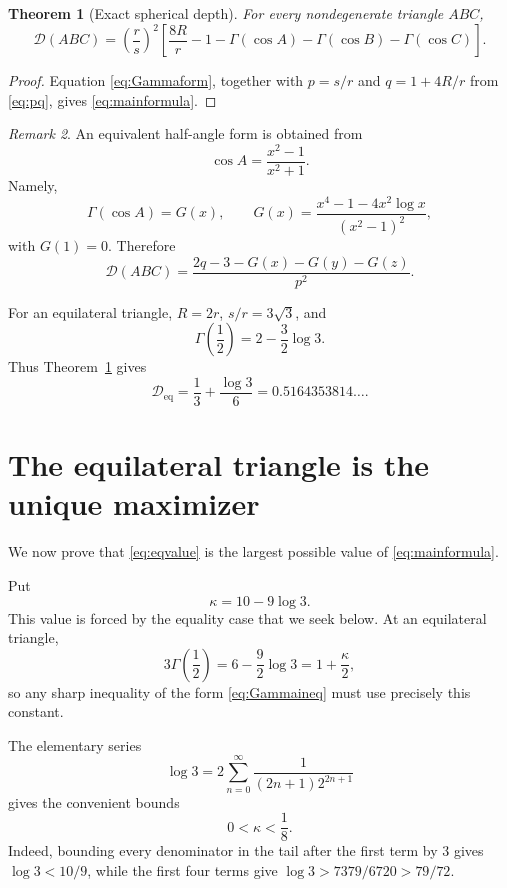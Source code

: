 \documentclass[11pt]{article}
\newtheorem{theorem}{Theorem}[section]
\theoremstyle{definition}
\theoremstyle{remark}
\newtheorem{remark}[theorem]{Remark}
\begin{document}
\begin{theorem}[Exact spherical depth]
\label{thm:formula}
For every nondegenerate triangle $ABC$,
\begin{equation}
\label{eq:mainformula}
\boxed{
\mathcal D(ABC)
=
\left(\frac r s\right)^2
\left[
\frac{8R}{r}-1
-\Gamma(\cos A)-\Gamma(\cos B)-\Gamma(\cos C)
\right].
}
\end{equation}
\end{theorem}

\begin{proof}
Equation \eqref{eq:Gammaform}, together with $p=s/r$ and $q=1+4R/r$ from \eqref{eq:pq}, gives \eqref{eq:mainformula}.
\end{proof}

\begin{remark}
An equivalent half-angle form is obtained from
\[
\cos A=\frac{x^2-1}{x^2+1}.
\]
Namely,
\[
\Gamma(\cos A)
=
G(x),
\qquad
G(x)=\frac{x^4-1-4x^2\log x}{(x^2-1)^2},
\]
with $G(1)=0$.  Therefore
\[
\mathcal D(ABC)
=
\frac{2q-3-G(x)-G(y)-G(z)}{p^2}.
\]
\end{remark}

For an equilateral triangle, $R=2r$, $s/r=3\sqrt3$, and
\[
\Gamma\left(\frac12\right)=2-\frac32\log3.
\]
Thus Theorem~\ref{thm:formula} gives
\begin{equation}
\label{eq:eqvalue}
\mathcal D_{\mathrm{eq}}
=
\frac13+\frac{\log3}{6}
=0.5164353814\ldots.
\end{equation}

\section{The equilateral triangle is the unique maximizer}
\label{sec:max}

We now prove that \eqref{eq:eqvalue} is the largest possible value of \eqref{eq:mainformula}.

Put
\begin{equation}
\label{eq:kappa}
\kappa=10-9\log3.
\end{equation}
This value is forced by the equality case that we seek below.  At an equilateral triangle,
\[
3\Gamma\left(\frac12\right)
=6-\frac92\log3
=1+\frac\kappa2,
\]
so any sharp inequality of the form \eqref{eq:Gammaineq} must use precisely this constant.

The elementary series
\[
\log3
=2\sum_{n=0}^{\infty}\frac{1}{(2n+1)2^{2n+1}}
\]
gives the convenient bounds
\begin{equation}
\label{eq:kappabounds}
0<\kappa<\frac18.
\end{equation}
Indeed, bounding every denominator in the tail after the first term by $3$ gives
$\log3<10/9$, while the first four terms give
$\log3>7379/6720>79/72$.
\end{document}
